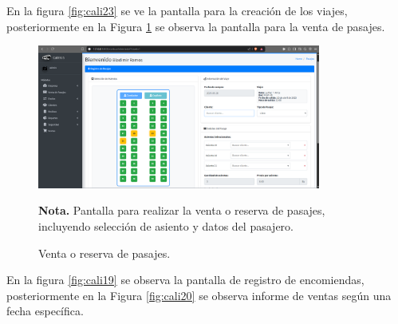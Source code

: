  En la figura \ref{fig:cali23} se ve la pantalla para la creación de los viajes, posteriormente en la Figura \ref{fig:cali18} se observa la pantalla para la venta de pasajes.
 
 \vspace{0.3cm} %
 
 \begin{figure}[!h] %
 	\caption[Venta o reserva de pasajes]
 	{\newline Venta o reserva de pasajes.} %
 	\centering
 	\includegraphics[width=0.83\textwidth]{imagenes/cap_3/Img_calibus/CALIBUS113.png} %
 	
 	\begin{flushleft}
 		\hspace{1.20cm} \textbf{Nota.} Pantalla para realizar la venta o reserva de pasajes, incluyendo selección de asiento y datos del pasajero. %
 	\end{flushleft}
 	\vspace{-16pt}
 	\label{fig:cali18} %
 \end{figure}
 
 \vspace{-0.6cm} %
 
 En la figura \ref{fig:cali19} se observa la pantalla de registro de encomiendas, posteriormente en la Figura \ref{fig:cali20} se observa informe de ventas según una fecha específica.
 
 \vspace{0.3cm} %
 
